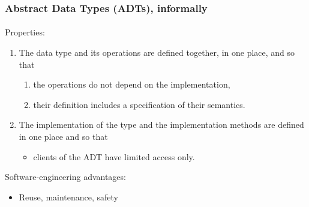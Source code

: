 \documentclass{beamer}
\begin{document}
\begin{frame}[fragile]
\frametitle{Abstract Data Types (ADTs), informally}
\framesubtitle{}
Properties: 

\begin{enumerate}
\item The data type and its operations are defined 
together, in one place, and so that
\begin{enumerate}
\item the operations do not depend on the implementation,
\item their definition includes a specification of their semantics.
\end{enumerate}
\item The implementation of the type and the implementation methods
are defined in one place and so that 
\begin{itemize}
\item clients of the ADT have
limited access only. 
\end{itemize}
\end{enumerate}
\bigskip

Software-engineering advantages:
\begin{itemize}
\item Reuse, maintenance, safety %
\end{itemize}
\end{frame}
\end{document}
